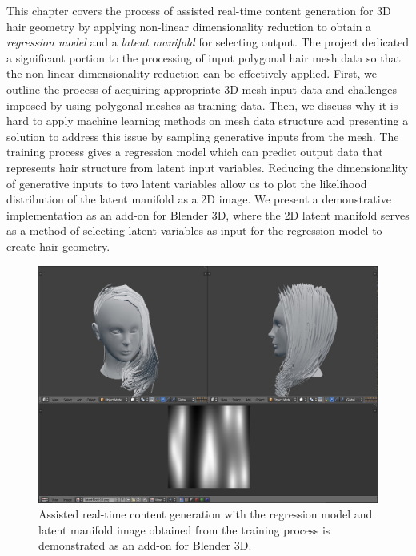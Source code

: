 \documentclass[ %
author={Dillon Keith Diep},
supervisor={Dr. Carl Henrik Ek},
degree={MEng},
title={ART-CG Hair:},
subtitle={Assisted Real-time Content Generation of Stylised Virtual Hair},
type={Research},
year={2017} ]{dissertation}
\begin{document}
This chapter covers the process of assisted real-time content generation for 3D hair geometry by applying non-linear dimensionality reduction to obtain a \textit{regression model} and a \textit{latent manifold} for selecting output. The project dedicated a significant portion to the processing of input polygonal hair mesh data so that the non-linear dimensionality reduction can be effectively applied. First, we outline the process of acquiring appropriate 3D mesh input data and challenges imposed by using polygonal meshes as training data. Then, we discuss why it is hard to apply machine learning methods on mesh data structure and presenting a solution to address this issue by sampling generative inputs from the mesh. The training process gives a regression model which can predict output data that represents hair structure from latent input variables. Reducing the dimensionality of generative inputs to two latent variables allow us to plot the likelihood distribution of the latent manifold as a 2D image. We present a demonstrative implementation as an add-on for Blender 3D, where the 2D latent manifold serves as a method of selecting latent variables as input for the regression model to create hair geometry.

\begin{figure}[!h]
	\centering
	\includegraphics[scale=0.3]{images/latentHairAddon}
	\caption{Assisted real-time content generation with the regression model and latent manifold image obtained from the training process is demonstrated as an add-on for Blender 3D.}
	\label{latentAddon}
\end{figure}
\end{document}
